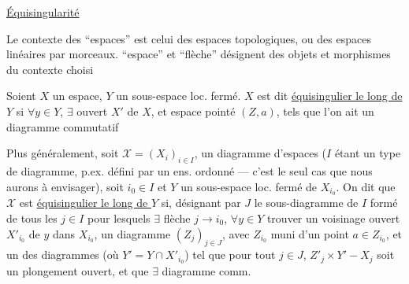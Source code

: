 \uline{Équisingularité}

 Le contexte des ``espaces'' est celui des espaces topologiques, ou des espaces linéaires  par morceaux.   ``espace'' et ``flèche'' désignent des  objets et morphismes du contexte choisi

Soient $X$ un espace, $Y$ un sous-espace loc. fermé. $X$ est dit \uline{équisingulier le long de $Y$} si $\forall y\in Y$, $\exists$ ouvert $X'$ de $X$, et espace pointé $(Z,a)$, tels que l'on ait un diagramme commutatif

Plus généralement, soit $\mathcal X=(X_i)_{i\in I}$, un diagramme d'espaces ($I$ étant un type de diagramme, p.ex. défini par un ens. ordonné --- c'est le seul cas que nous aurons à envisager), soit $i_0\in I$ et $Y$ un sous-espace loc. fermé de $X_{i_0}$. On dit que $\mathcal X$ est \uline{équisingulier le long de $Y$} si, désignant par $J$ le sous-diagramme de $I$ formé de tous les $j\in I$ pour lesquels  $\exists$ flèche $j\longrightarrow i_0$, $\forall y\in Y$  trouver un voisinage ouvert $X'_{i_0}$ de $y$ dans $X_{i_0}$, un diagramme  $(Z_j)_{j\in J}$, avec $Z_{i_0}$ muni d'un point $a\in Z_{i_0}$, et un  des diagrammes (où $Y'=Y\cap X'_{i_0}$)
tel que pour tout $j\in J$, $Z'_j\times Y' - X_j$ soit un plongement ouvert, et que $\exists$ diagramme comm.
